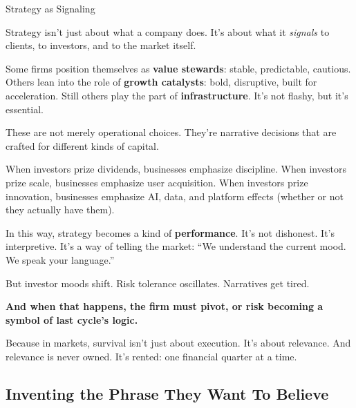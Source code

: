 \begin{PhilosophicalSidebar}{Strategy as Signaling}

  Strategy isn’t just about what a company does.  
  It’s about what it \textit{signals} to clients, to investors, and to the market itself.
  
  \medskip
  
  Some firms position themselves as \textbf{value stewards}: stable, predictable, cautious.  
  Others lean into the role of \textbf{growth catalysts}: bold, disruptive, built for acceleration.  
  Still others play the part of \textbf{infrastructure}. It's not flashy, but it's essential.
  
  \medskip
  
  These are not merely operational choices.  
  They’re narrative decisions that are crafted for different kinds of capital.
  
  \medskip
  
  When investors prize dividends, businesses emphasize discipline.  
  When investors prize scale, businesses emphasize user acquisition.  
  When investors prize innovation, businesses emphasize AI, data, and platform effects
  (whether or not they actually have them).
  
  \medskip
  
  In this way, strategy becomes a kind of \textbf{performance}.  
  It's not dishonest. It's interpretive.  
  It's a way of telling the market: ``We understand the current mood. We speak your language.''
  
  \medskip
  
  But investor moods shift.  
  Risk tolerance oscillates.  
  Narratives get tired.

  \medskip
  
  \textbf{And when that happens, the firm must pivot, or risk becoming a symbol of last cycle’s logic.}
  
  \medskip
  
  Because in markets, survival isn’t just about execution.  
  It’s about relevance.  
  And relevance is never owned.  
  It’s rented: one financial quarter at a time.
  
\end{PhilosophicalSidebar}

\medskip

\subsection{Inventing the Phrase They Want To Believe}

